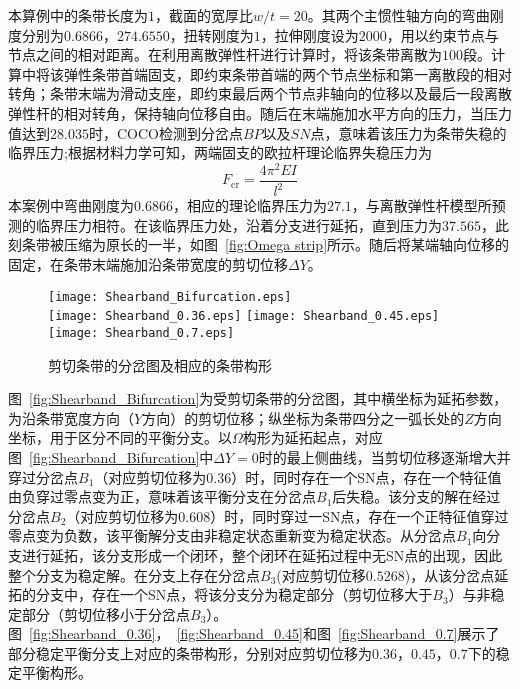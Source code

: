 本算例中的条带长度为$1$，截面的宽厚比$w/t=20$。其两个主惯性轴方向的弯曲刚度分别为$0.6866$，$274.6550$，扭转刚度为$1$，拉伸刚度设为$2000$，用以约束节点与节点之间的相对距离。在利用离散弹性杆进行计算时，将该条带离散为$100$段。计算中将该弹性条带首端固支，即约束条带首端的两个节点坐标和第一离散段的相对转角；条带末端为滑动支座，即约束最后两个节点非轴向的位移以及最后一段离散弹性杆的相对转角，保持轴向位移自由。随后在末端施加水平方向的压力，当压力值达到$28.035$时，COCO检测到分岔点$BP$以及$SN$点，意味着该压力为条带失稳的临界压力;根据材料力学可知，两端固支的欧拉杆理论临界失稳压力为
\begin{equation}
	F_{\mathrm{cr}}=\frac{4\pi^2EI}{l^2}
\end{equation}
本案例中弯曲刚度为$0.6866$，相应的理论临界压力为$27.1$，与离散弹性杆模型所预测的临界压力相符。在该临界压力处，沿着分支进行延拓，直到压力为$37.565$，此刻条带被压缩为原长的一半，如图~\ref{fig:Omega strip}所示。随后将某端轴向位移的固定，在条带末端施加沿条带宽度的剪切位移$\Delta Y$。
\begin{figure}
	\centering
	{\texttt{[image: Shearband\_Bifurcation.eps]}}\\
	{\texttt{[image: Shearband\_0.36.eps]}}
	{\texttt{[image: Shearband\_0.45.eps]}}
	{\texttt{[image: Shearband\_0.7.eps]}}
	\caption{剪切条带的分岔图及相应的条带构形}
	\label{fig:剪切条带的分岔图及相应的条带构形}
\end{figure}

图~\ref{fig:Shearband_Bifurcation}为受剪切条带的分岔图，其中横坐标为延拓参数，为沿条带宽度方向（$Y$方向）的剪切位移；纵坐标为条带四分之一弧长处的$Z$方向坐标，用于区分不同的平衡分支。以$\Omega$构形为延拓起点，对应图~\ref{fig:Shearband_Bifurcation}中$\Delta Y=0$时的最上侧曲线，当剪切位移逐渐增大并穿过分岔点$B_1$（对应剪切位移为$0.36$）时，同时存在一个SN点，存在一个特征值由负穿过零点变为正，意味着该平衡分支在分岔点$B_1$后失稳。该分支的解在经过分岔点$B_2$（对应剪切位移为$0.608$）时，同时穿过一SN点，存在一个正特征值穿过零点变为负数，该平衡解分支由非稳定状态重新变为稳定状态。从分岔点$B_1$向分支进行延拓，该分支形成一个闭环，整个闭环在延拓过程中无SN点的出现，因此整个分支为稳定解。在分支上存在分岔点$B_3$(对应剪切位移$0.5268$)，从该分岔点延拓的分支中，存在一个SN点，将该分支分为稳定部分（剪切位移大于$B_3$）与非稳定部分（剪切位移小于分岔点$B_3$）。图~\ref{fig:Shearband_0.36}，~\ref{fig:Shearband_0.45}和图~\ref{fig:Shearband_0.7}展示了部分稳定平衡分支上对应的条带构形，分别对应剪切位移为$0.36$，$0.45$，$0.7$下的稳定平衡构形。

